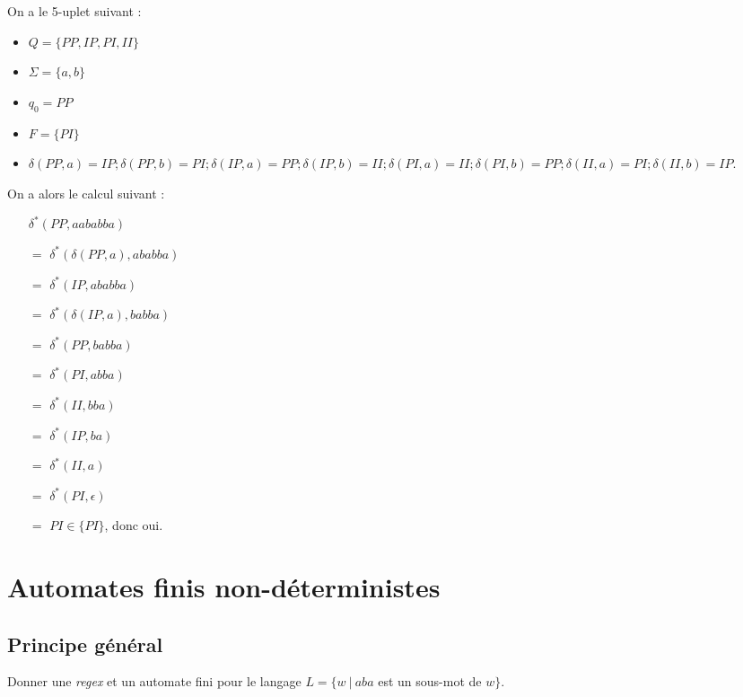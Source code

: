 \begin{correction*}
On a le 5-uplet suivant :
\begin{itemize}
\item $Q = \{PP,IP,PI,II\}$
\item $\Sigma = \{a,b\}$
\item $q_0 = PP$
\item $F = \{PI\}$
\item $\delta(PP,a) = IP; \delta(PP,b) = PI; \delta(IP,a) = PP; \delta(IP,b) = II; \delta(PI,a) = II; \delta(PI,b) = PP; \delta(II,a) = PI; \delta(II,b) = IP$.
\end{itemize}

On a alors le calcul suivant : 

\begin{itemize}
\item[] $\delta^*(PP,aababba)$
\item[$=$] $\delta^*(\delta(PP,a),ababba)$
\item[$=$] $\delta^*(IP,ababba)$
\item[$=$] $\delta^*(\delta(IP,a),babba)$
\item[$=$] $\delta^*(PP,babba)$
\item[$=$] $\delta^*(PI,abba)$
\item[$=$] $\delta^*(II,bba)$
\item[$=$] $\delta^*(IP,ba)$
\item[$=$] $\delta^*(II,a)$
\item[$=$] $\delta^*(PI,\epsilon)$
\item[$=$] $PI \in \{PI\}$, donc oui.
\end{itemize}

\end{correction*}

\section{Automates finis non-déterministes}
\label{NDFA}

\subsection{Principe général}


\begin{exercice}
Donner une \textit{regex} et un automate fini pour le langage $L = \{w ~|~ aba$ est un sous-mot de $w\}$.
\end{exercice}

